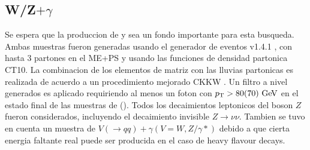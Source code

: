 \subsection{W/Z$+\gamma$}

Se espera que la produccion de {\wgam} y {\zgam} sea un fondo importante
para esta busqueda. Ambas muestras fueron generadas usando el generador
de eventos {\sherpa} v1.4.1 \cite{SherpaGen}, con hasta 3 partones en el
ME+PS y usando las funciones de densidad partonica CT10.
La combinacion de los elementos de matriz con las lluvias partonicas
es realizada de acuerdo a un procedimiento mejorado CKKW \cite{Catani:2001cc,Krauss:2002up}.
Un filtro a nivel generados es aplicado requiriendo al menos un foton
con $\pt > 80(70) \gev$ en el estado final de las muestras de {\wgam} (\zgam).
Todos los decaimientos leptonicos del boson $Z$ fueron considerados,
incluyendo el decaimiento invisible $Z\to\nu\nu$.
Tambien se tuvo en cuenta un muestra de $V(\to qq)+\gamma  (V=W,Z/\gamma*)$
debido a que cierta energia faltante real puede  ser producida en el caso
de heavy flavour decays.
%

